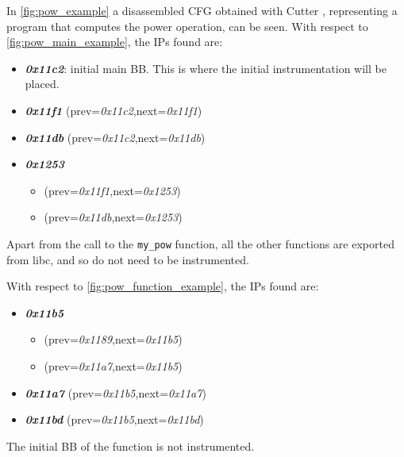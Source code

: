 In \cref{fig:pow_example} a disassembled \gls{CFG} obtained with Cutter \cite{cutter}, representing a program that computes the power operation, can be seen.
With respect to \cref{fig:pow_main_example}, the \gls{IP}s found are: 
\begin{itemize}
    \item \textbf{\textit{0x11c2}}: initial main \gls{BB}. This is where the initial instrumentation will be placed.
    \item \textbf{\textit{0x11f1}} (prev=\textit{0x11c2},next=\textit{0x11f1}) 
    \item \textbf{\textit{0x11db}} (prev=\textit{0x11c2},next=\textit{0x11db}) 
    \item \textbf{\textit{0x1253}} 
        \begin{itemize}
            \item (prev=\textit{0x11f1},next=\textit{0x1253})
            \item (prev=\textit{0x11db},next=\textit{0x1253}) 
        \end{itemize} 
    
\end{itemize}
Apart from the call to the \texttt{my\_pow} function, all the other functions are exported from libc, and so do not 
need to be instrumented.

With respect to \cref{fig:pow_function_example}, the \gls{IP}s found are:
\begin{itemize}
    \item \textbf{\textit{0x11b5}} 
        \begin{itemize}
            \item (prev=\textit{0x1189},next=\textit{0x11b5}) 
            \item (prev=\textit{0x11a7},next=\textit{0x11b5}) 
        \end{itemize}
    \item \textbf{\textit{0x11a7}} (prev=\textit{0x11b5},next=\textit{0x11a7}) 
    \item \textbf{\textit{0x11bd}} (prev=\textit{0x11b5},next=\textit{0x11bd}) 
\end{itemize}
The initial \gls{BB} of the function is not instrumented.
\clearpage